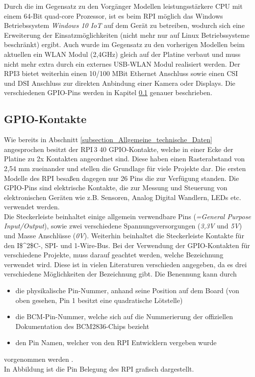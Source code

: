 Durch die im Gegensatz zu den Vorgänger Modellen leistungsstärkere CPU mit einem 64-Bit quad-core Prozessor, ist es beim RPI möglich das Windows Betriebssystem \textit{Windows 10 IoT} auf dem Gerät zu betreiben, wodurch sich eine Erweiterung der Einsatzmöglichkeiten (nicht mehr nur auf Linux Betriebssysteme beschränkt) ergibt. Auch wurde im Gegensatz zu den vorherigen Modellen beim aktuellen ein WLAN Modul (2,4\;GHz) gleich auf der Platine verbaut und muss nicht mehr extra durch ein externes USB-WLAN Modul realisiert werden. Der \ac{RPI}3 bietet weiterhin einen 10/100 MBit Ethernet Anschluss sowie einen \ac{CSI} und \ac{DSI} Anschluss zur direkten Anbindung einer Kamera oder Displays. Die verschiedenen GPIO-Pins werden in Kapitel \ref{subsection_GPIO} genauer beschrieben.

\subsection{GPIO-Kontakte}
\label{subsection_GPIO}
Wie bereits in Abschnitt \ref{subsection_Allgemeine_technische_Daten} angesprochen besitzt der \ac{RPI}\,3 40 GPIO-Kontakte, welche in einer Ecke der Platine zu 2\;x Kontakten angeordnet sind. Diese haben einen Rasterabstand von 2,54 mm zueinander und stellen die Grundlage für viele Projekte dar. Die ersten Modelle des \ac{RPI} besaßen dagegen nur 26 Pins die zur Verfügung standen. Die GPIO-Pins sind elektrische Kontakte, die zur Messung und Steuerung von elektronischen Geräten wie z.B. Sensoren, Analog Digital Wandlern, LEDs etc. verwendet werden.\\
Die Steckerleiste beinhaltet einige allgemein verwendbare Pins (\textit{=\;General Purpose Input\;/\;Output}), sowie zwei verschiedene Spannungsversorgungen (\textit{3,3\;V} und \textit{5\;V}) und Masse Anschlüsse (\textit{0\;V}). Weiterhin beinhaltet die Steckerleiste Kontakte für den \ac{I$^2$C}-, \ac{SPI}- und 1-Wire-Bus. Bei der Verwendung der GPIO-Kontakten für verschiedene Projekte, muss darauf geachtet werden, welche Bezeichnung verwendet wird. Diese ist in vielen Literaturen verschieden angegeben, da es drei verschiedene Möglichkeiten der Bezeichnung gibt. Die Benennung kann durch
\begin{itemize}
\item die physikalische Pin-Nummer, anhand seine Position auf dem Board (von oben gesehen, Pin 1 besitzt eine quadratische Lötstelle)
\item die BCM-Pin-Nummer, welche sich auf die Nummerierung der offiziellen Dokumentation des BCM2836-Chips bezieht
\item den Pin Namen, welcher von den \ac{RPI} Entwicklern vergeben wurde 
\end{itemize} 
vorgenommen werden \citep{Raspberri_Pi_Handbuch}.\\
In Abbildung ist die Pin Belegung des \ac{RPI} grafisch dargestellt.

